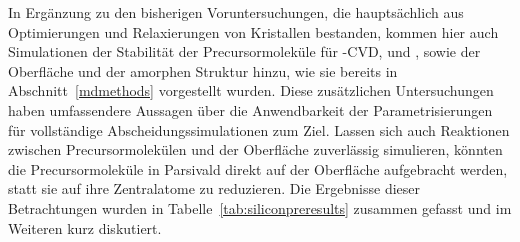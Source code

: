 In Ergänzung zu den bisherigen Voruntersuchungen, die hauptsächlich aus Optimierungen und Relaxierungen von Kristallen bestanden, kommen hier auch Simulationen der Stabilität der Precursormoleküle für -CVD,  und , sowie der Oberfläche und der amorphen Struktur hinzu, wie sie bereits in Abschnitt~\ref{mdmethods} vorgestellt wurden.
Diese zusätzlichen Untersuchungen haben umfassendere Aussagen über die Anwendbarkeit der Parametrisierungen für vollständige Abscheidungssimulationen zum Ziel.
Lassen sich auch Reaktionen zwischen Precursormolekülen und der Oberfläche zuverlässig simulieren, könnten die Precursormoleküle in Parsivald direkt auf der Oberfläche aufgebracht werden, statt sie auf ihre Zentralatome zu reduzieren.
Die Ergebnisse dieser Betrachtungen wurden in Tabelle~\ref{tab:siliconpreresults} zusammen gefasst und im Weiteren kurz diskutiert.

